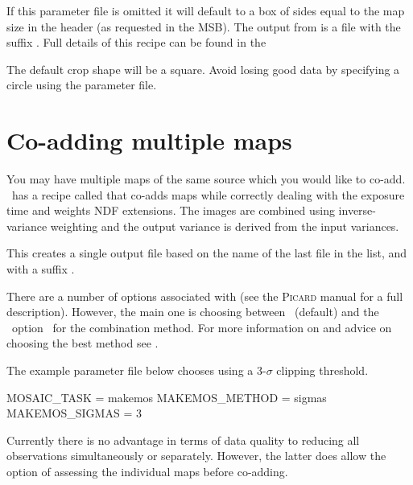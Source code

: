 If this parameter file is omitted it will default to a box of sides
equal to the map size in the header (as requested in the MSB). The
output from  is a file with the suffix
. Full details of this recipe can be found in the

\begin{tip}
  The default crop shape will be a square. Avoid losing good data by
  specifying a circle using the parameter file.
\end{tip}

\section{Co-adding multiple maps}
\label{sec:coadd}

You may have multiple maps of the same source which you would like to
co-add. \picard\ has a recipe called
that co-adds maps while correctly dealing with the exposure time and
weights NDF extensions. The images are combined using inverse-variance
weighting and the output variance is derived from the input variances.

\begin{terminalv}
\end{terminalv}

This creates a single output file based on the name of the last file
in the list, and with a suffix .

There are a number of options associated with
 (see the \textsc{Picard} manual for a full
description). However, the main one is choosing between \wcsmosaic\
(default) and the \ccdpack\ option \makemos\ for the combination
method. For more information on \task{makemos} and advice on choosing the
best method see \xref{\textbf{SUN/139}}{sun139}{}.

The example parameter file below chooses  using a 3-$\sigma$
clipping threshold.

\begin{terminalv}
MOSAIC_TASK = makemos
MAKEMOS_METHOD = sigmas
MAKEMOS_SIGMAS = 3
\end{terminalv}

Currently there is no advantage in terms of data quality to reducing
all observations simultaneously or separately. However, the latter
does allow the option of assessing the individual maps before co-adding.

